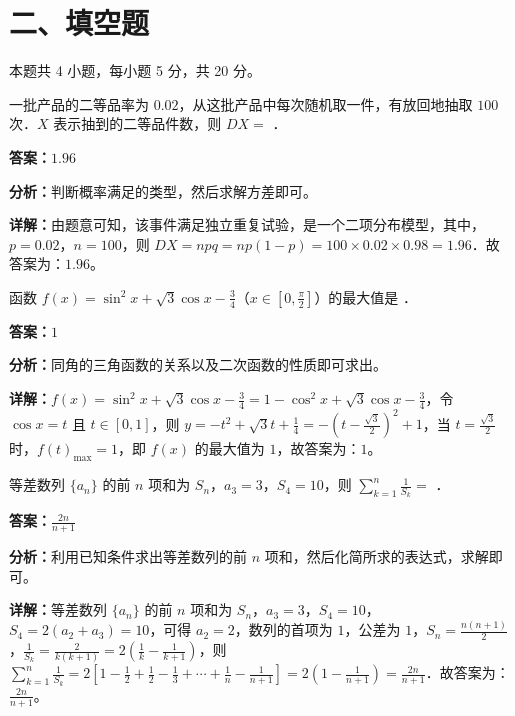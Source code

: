 \section*{二、填空题}
本题共 4 小题，每小题 5 分，共 20 分。

\begin{question}[points=5]
一批产品的二等品率为 $0.02$，从这批产品中每次随机取一件，有放回地抽取 $100$ 次．$X$ 表示抽到的二等品件数，则 $DX=$ ．
\fillin[{$1.96$}]
\begin{solution}
\textbf{答案：}$1.96$

\textbf{分析：}判断概率满足的类型，然后求解方差即可。

\textbf{详解：}由题意可知，该事件满足独立重复试验，是一个二项分布模型，其中，$p=0.02$，$n=100$，则 $DX=npq=np(1-p)=100\times0.02\times0.98=1.96$．故答案为：$1.96$。
\end{solution}
\end{question}

\begin{question}[points=5]
函数 $f(x)=\sin^2x+\sqrt{3}\cos x-\frac{3}{4}$（$x\in[0,\frac{\pi}{2}]$）的最大值是 ．
\fillin[{$1$}]
\begin{solution}
\textbf{答案：}$1$

\textbf{分析：}同角的三角函数的关系以及二次函数的性质即可求出。

\textbf{详解：}$f(x)=\sin^2x+\sqrt{3}\cos x-\frac{3}{4}=1-\cos^2x+\sqrt{3}\cos x-\frac{3}{4}$，令 $\cos x=t$ 且 $t\in[0,1]$，则 $y=-t^2+\sqrt{3}t+\frac{1}{4}=-(t-\frac{\sqrt{3}}{2})^2+1$，当 $t=\frac{\sqrt{3}}{2}$ 时，$f(t)_{\max}=1$，即 $f(x)$ 的最大值为 $1$，故答案为：$1$。
\end{solution}
\end{question}

\begin{question}[points=5]
等差数列 $\{a_n\}$ 的前 $n$ 项和为 $S_n$，$a_3=3$，$S_4=10$，则 $\sum_{k=1}^{n}\frac{1}{S_k}=$ ．
\fillin[{$\frac{2n}{n+1}$}]
\begin{solution}
\textbf{答案：}$\frac{2n}{n+1}$

\textbf{分析：}利用已知条件求出等差数列的前 $n$ 项和，然后化简所求的表达式，求解即可。

\textbf{详解：}等差数列 $\{a_n\}$ 的前 $n$ 项和为 $S_n$，$a_3=3$，$S_4=10$，$S_4=2(a_2+a_3)=10$，可得 $a_2=2$，数列的首项为 $1$，公差为 $1$，$S_n=\frac{n(n+1)}{2}$，$\frac{1}{S_k}=\frac{2}{k(k+1)}=2(\frac{1}{k}-\frac{1}{k+1})$，则 $\sum_{k=1}^{n}\frac{1}{S_k}=2[1-\frac{1}{2}+\frac{1}{2}-\frac{1}{3}+\cdots+\frac{1}{n}-\frac{1}{n+1}]=2(1-\frac{1}{n+1})=\frac{2n}{n+1}$．故答案为：$\frac{2n}{n+1}$。
\end{solution}
\end{question}

